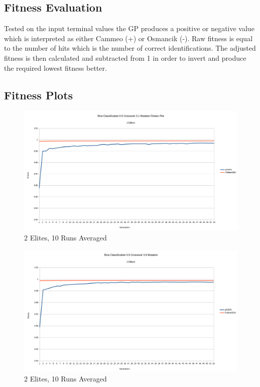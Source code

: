 \documentclass[]{report}
\begin{document}
\subsection{Fitness Evaluation}
Tested on the input terminal values the GP produces a positive or negative value which is interpreted as either Cammeo (+) or Osmancik (-). Raw fitness is equal to the number of hits which is the number of correct identifications. The adjusted fitness is then calculated and subtracted from 1 in order to invert and produce the required lowest fitness better.
\subsection{Fitness Plots}
\begin{figure}[H]
	\centering
	\includegraphics[width=1.0\linewidth]{fp6}
	\caption{2 Elites, 10 Runs Averaged}
	\label{fig:fp6}
\end{figure}
\begin{figure}[H]
	\centering
	\includegraphics[width=1.0\linewidth]{fp7}
	\caption{2 Elites, 10 Runs Averaged}
	\label{fig:fp7}
\end{figure}
\end{document}
